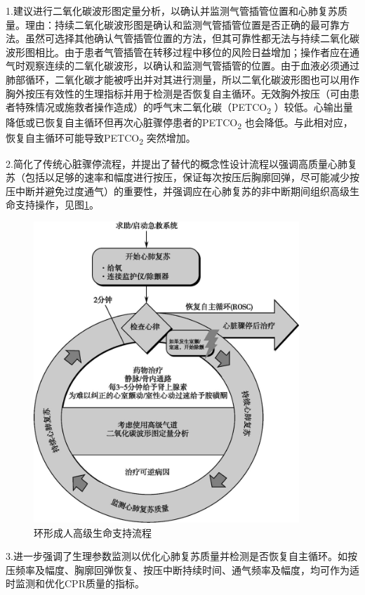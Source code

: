 1.建议进行二氧化碳波形图定量分析，以确认并监测气管插管位置和心肺复苏质量。理由：持续二氧化碳波形图是确认和监测气管插管位置是否正确的最可靠方法。虽然可选择其他确认气管插管位置的方法，但其可靠性都无法与持续二氧化碳波形图相比。由于患者气管插管在转移过程中移位的风险日益增加；操作者应在通气时观察连续的二氧化碳波形，以确认和监测气管插管的位置。由于血液必须通过肺部循环，二氧化碳才能被呼出并对其进行测量，所以二氧化碳波形图也可以用作胸外按压有效性的生理指标并用于检测是否恢复自主循环。无效胸外按压（可由患者特殊情况或施救者操作造成）的呼气末二氧化碳（PETCO\textsubscript{2}
）较低。心输出量降低或已恢复自主循环但再次心脏骤停患者的PETCO\textsubscript{2}
也会降低。与此相对应，恢复自主循环可能导致PETCO\textsubscript{2}
突然增加。

2.简化了传统心脏骤停流程，并提出了替代的概念性设计流程以强调高质量心肺复苏（包括以足够的速率和幅度进行按压，保证每次按压后胸廓回弹，尽可能减少按压中断并避免过度通气）的重要性，并强调应在心肺复苏的非中断期间组织高级生命支持操作，见图\ref{fig101-1}。

\begin{figure}[!htbp]
 \centering
 \includegraphics[width=3.9375in,height=4.46875in]{./images/Image00402.jpg}
 \captionsetup{justification=centering}
 \caption{环形成人高级生命支持流程}
 \label{fig101-1}
  \end{figure} 

3.进一步强调了生理参数监测以优化心肺复苏质量并检测是否恢复自主循环。如按压频率及幅度、胸廓回弹恢复、按压中断持续时间、通气频率及幅度，均可作为适时监测和优化CPR质量的指标。

